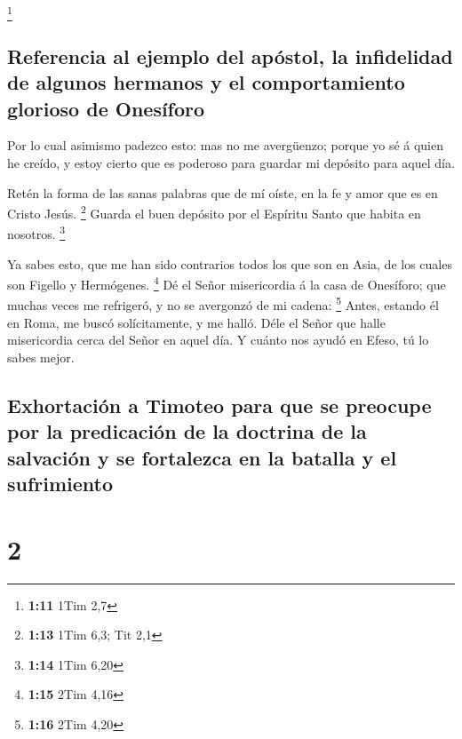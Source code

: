 \footnote{\textbf{1:11} 1Tim 2,7}

\hypertarget{referencia-al-ejemplo-del-apuxf3stol-la-infidelidad-de-algunos-hermanos-y-el-comportamiento-glorioso-de-onesuxedforo}{%
\subsection{Referencia al ejemplo del apóstol, la infidelidad de algunos
hermanos y el comportamiento glorioso de
Onesíforo}\label{referencia-al-ejemplo-del-apuxf3stol-la-infidelidad-de-algunos-hermanos-y-el-comportamiento-glorioso-de-onesuxedforo}}

 Por lo cual asimismo padezco esto: mas no me avergüenzo;
porque yo sé á quien he creído, y estoy cierto que es poderoso para
guardar mi depósito para aquel día.

 Retén la forma de las sanas palabras que de mí oíste, en
la fe y amor que es en Cristo Jesús. \footnote{\textbf{1:13} 1Tim 6,3;
  Tit 2,1}  Guarda el buen depósito por el Espíritu Santo
que habita en nosotros. \footnote{\textbf{1:14} 1Tim 6,20}

 Ya sabes esto, que me han sido contrarios todos los que
son en Asia, de los cuales son Figello y Hermógenes. \footnote{\textbf{1:15}
  2Tim 4,16}  Dé el Señor misericordia á la casa de
Onesíforo; que muchas veces me refrigeró, y no se avergonzó de mi
cadena: \footnote{\textbf{1:16} 2Tim 4,20}  Antes, estando
él en Roma, me buscó solícitamente, y me halló.  Déle el
Señor que halle misericordia cerca del Señor en aquel día. Y cuánto nos
ayudó en Efeso, tú lo sabes mejor.

\hypertarget{exhortaciuxf3n-a-timoteo-para-que-se-preocupe-por-la-predicaciuxf3n-de-la-doctrina-de-la-salvaciuxf3n-y-se-fortalezca-en-la-batalla-y-el-sufrimiento}{%
\subsection{Exhortación a Timoteo para que se preocupe por la
predicación de la doctrina de la salvación y se fortalezca en la batalla
y el
sufrimiento}\label{exhortaciuxf3n-a-timoteo-para-que-se-preocupe-por-la-predicaciuxf3n-de-la-doctrina-de-la-salvaciuxf3n-y-se-fortalezca-en-la-batalla-y-el-sufrimiento}}

\hypertarget{section-1}{%
\section{2}\label{section-1}}

